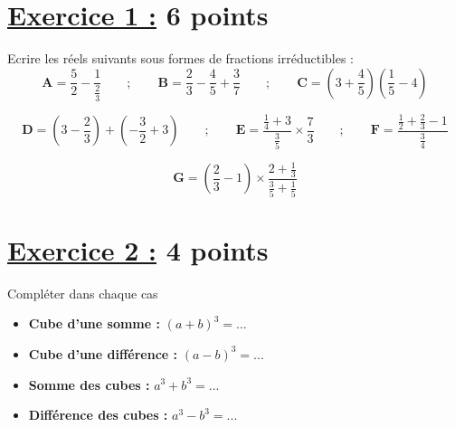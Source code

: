 \documentclass[12pt,a4paper]{article}
\begin{document}
\renewcommand{\arraystretch}{1.5}
\renewcommand{\arrayrulewidth}{1.2pt}
\vspace{3cm}

\section*{\underline{Exercice 1 :} 6 points}
Ecrire les réels suivants sous formes de fractions irréductibles :
\[
\textbf{A}=\frac{5}{2}-\frac{1}{\frac{2}{3}} \quad\quad;\quad\quad \textbf{B}=\frac{2}{3}-\frac{4}{5}+\frac{3}{7} \quad\quad;\quad\quad \textbf{C}=\left(3+\frac{4}{5} \right) \left(\frac{1}{5}-4 \right) 
\]

\[
\textbf{D}=\left(3-\frac{2}{3} \right) + \left(-\frac{3}{2}+3 \right) \quad\quad;\quad\quad \textbf{E}=\frac{\frac{1}{4}+3}{\frac{3}{5}} \times \frac{7}{3} \quad\quad;\quad\quad
\textbf{F}= \frac{\frac{1}{2}+\frac{2}{3}-1}{\frac{3}{4}}
\]

\[
 \textbf{G}=\left(\frac{2}{3}-1 \right)\times \frac{2+\frac{1}{3}}{\frac{3}{5}+\frac{1}{5}}
\]

\section*{\underline{Exercice 2 :} 4 points}
Compléter dans chaque cas
\begin{itemize}
    \item \textbf{Cube d'une somme :} \quad $(a + b)^3 = ...$
    \item \textbf{Cube d'une différence :} \quad $(a - b)^3 = ...$
    \item \textbf{Somme des cubes :} \quad $a^3 + b^3 = ...$
    \item \textbf{Différence des cubes :} \quad $a^3 - b^3 = ...$
\end{itemize}
\end{document}
